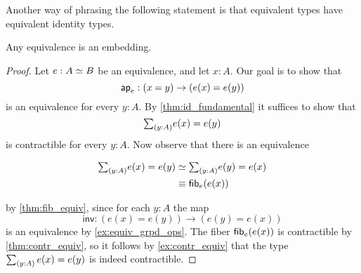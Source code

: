 Another way of phrasing the following statement is that equivalent types have equivalent identity types.

\begin{thm}
\label{cor:emb_equiv} 
Any equivalence is an embedding.
\end{thm}

\begin{proof}
Let $e:\eqv{A}{B}$ be an equivalence, and let $x:A$. Our goal is to show that
\begin{equation*}
\apfunc{e} : (\id{x}{y})\to (\id{e(x)}{e(y)})
\end{equation*}
is an equivalence for every $y:A$. By \cref{thm:id_fundamental} it suffices to show that 
\begin{equation*}
\sm{y:A}e(x)=e(y)
\end{equation*}
is contractible for every $y:A$. Now observe that there is an equivalence
\begin{samepage}
\begin{align*}
\sm{y:A}e(x)=e(y) & \eqvsym \sm{y:A}e(y)=e(x) \\
& \jdeq \fib{e}{e(x)}
\end{align*}
\end{samepage}
by \cref{thm:fib_equiv}, since for each $y:A$ the map
\begin{equation*}
\mathsf{inv} : (e(x)=e(y))\to (e(y)= e(x))
\end{equation*}
is an equivalence by \cref{ex:equiv_grpd_ops}.
The fiber $\mathsf{fib}_{e}(e(x))$ is contractible by \cref{thm:contr_equiv}, so it follows by \cref{ex:contr_equiv} that the type $\sm{y:A}e(x)=e(y)$ is indeed contractible.
\end{proof}

